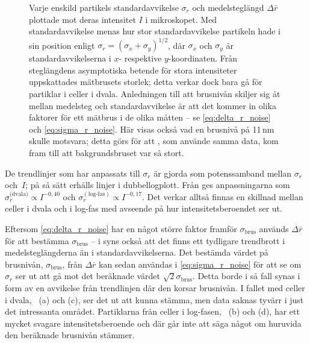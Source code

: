\begin{figure}\centering
   \subfigure[][]{}
   \subfigure[][]{}
   \subfigure[][]{}
   \subfigure[][]{}
\caption{Varje enskild partikels standardavvikelse $\sigma_r$ och medelsteglängd $\Delta{\bar{r}}$ plottade mot deras intensitet $I$ i mikroskopet. 
Med standardavvikelse menas hur stor standardavvikelse partikeln hade i sin position enligt $\sigma_r=(\sigma_x+\sigma_y)^{1/2}$, där $\sigma_x$ och $\sigma_y$ är standardavvikelserna i $x$- respektive $y$-koordinaten.
Från steglängdens asymptotiska betende för stora intensiteter uppskattades mätbrusets storlek; detta verkar dock bara gå för partiklar i celler i dvala. 
Anledningen till att brusnivån skiljer sig åt mellan medelsteg och standardavvikelse är att det kommer in olika faktorer för ett mätbrus i de olika måtten -- se \eqref{eq:delta_r_noise} och \eqref{eq:sigma_r_noise}. 
Här visas också vad en brusnivå på 11\,nm skulle motsvara; detta görs för att \cite{Midtveldt_etal2016}, som använde samma data, kom fram till att bakgrundsbruset var så stort.}
\label{fig:storleksberoende}
\end{figure}

De trendlinjer som har anpassats till $\sigma_r$ är gjorda som potenssamband mellan $\sigma_r$ och~$I$; på så sätt erhålls linjer i dubbellogplott. Från  ges anpassningarna som $\sigma_r^{\text{(dvala)}} \propto I^{-0,40}$ och $\sigma_r^{(\text{log-fas})} \propto I^{-0,17}$. Det verkar alltså finnas en skillnad mellan celler i dvala och i log-fas med avseende på hur intensitetsberoendet ser ut.

Eftersom \eqref{eq:delta_r_noise} har en något större faktor framför $\sigma_\text{brus}$ används $\Delta{\bar{r}}$ för att bestämma $\sigma_\text{brus}$ -- i  syns också att det finns ett tydligare trendbrott i medelsteglängderna än i standardavvikelserna. Det bestämda värdet på brusnivån, $\sigma_\text{brus}$, från $\Delta{\bar{r}}$ kan sedan användas i \eqref{eq:sigma_r_noise} för att se om $\sigma_r$ ser ut att gå mot det beräknade värdet $\sqrt{2}\sigma_\text{brus}$. Detta borde i så fall synas i form av en avvikelse från trendlinjen där den korsar brusnivån.
I fallet med celler i dvala, ~(a) och (c), ser det ut att kunna stämma, men data saknas tyvärr i just det intressanta området. Partiklarna från celler i log-fasen, ~(b) och (d), har ett mycket svagare intensitetsberoende och där går inte att säga något om huruvida den beräknade brusnivån stämmer. 

